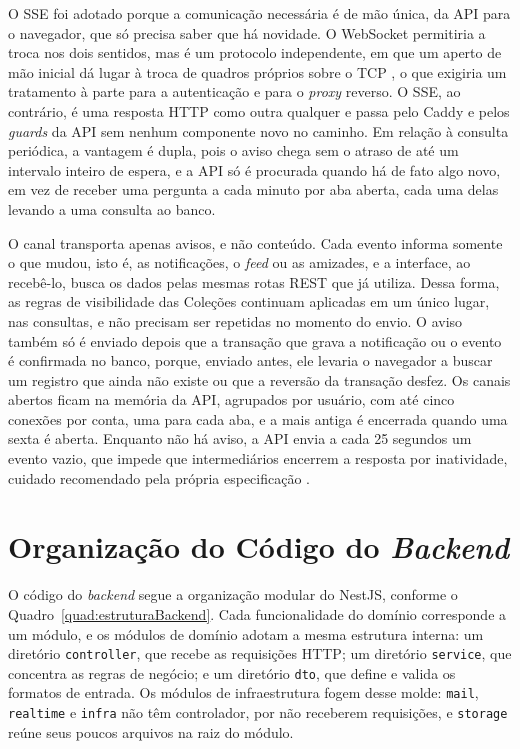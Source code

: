 O SSE foi adotado porque a comunicação necessária é de mão única, da API para o navegador, que só precisa saber que há novidade. O WebSocket permitiria a
troca nos dois sentidos, mas é um protocolo independente, em que um aperto de mão inicial dá lugar à troca de quadros próprios sobre o TCP \cite{rfc6455},
o que exigiria um tratamento à parte para a autenticação e para o \textit{proxy} reverso. O SSE, ao contrário, é uma resposta HTTP como outra qualquer e
passa pelo Caddy e pelos \textit{guards} da API sem nenhum componente novo no caminho. Em relação à consulta periódica, a vantagem é dupla, pois o aviso
chega sem o atraso de até um intervalo inteiro de espera, e a API só é procurada quando há de fato algo novo, em vez de receber uma pergunta a cada minuto
por aba aberta, cada uma delas levando a uma consulta ao banco.

O canal transporta apenas avisos, e não conteúdo. Cada evento informa somente o que mudou, isto é, as notificações, o \textit{feed} ou as amizades, e a
interface, ao recebê-lo, busca os dados pelas mesmas rotas REST que já utiliza. Dessa forma, as regras de visibilidade das Coleções continuam aplicadas em
um único lugar, nas consultas, e não precisam ser repetidas no momento do envio. O aviso também só é enviado depois que a transação que grava a
notificação ou o evento é confirmada no banco, porque, enviado antes, ele levaria o navegador a buscar um registro que ainda não existe ou que a reversão
da transação desfez. Os canais abertos ficam na memória da API, agrupados por usuário, com até cinco conexões por conta, uma para cada aba, e a mais
antiga é encerrada quando uma sexta é aberta. Enquanto não há aviso, a API envia a cada 25 segundos um evento vazio, que impede que intermediários
encerrem a resposta por inatividade, cuidado recomendado pela própria especificação \cite{whatwg2026sse}.

\section{Organização do Código do \textit{Backend}}
\label{sec:organizacaoBackend}

O código do \textit{backend} segue a organização modular do NestJS, conforme o Quadro~\ref{quad:estruturaBackend}. Cada funcionalidade do domínio corresponde a um módulo, e os módulos de domínio adotam a mesma estrutura interna: um diretório \texttt{controller}, que recebe as requisições HTTP; um diretório \texttt{service}, que concentra as regras de negócio; e um diretório \texttt{dto}, que define e valida os formatos de entrada. Os módulos de infraestrutura fogem desse molde: \texttt{mail}, \texttt{realtime} e \texttt{infra} não têm controlador, por não receberem requisições, e \texttt{storage} reúne seus poucos arquivos na raiz do módulo.

